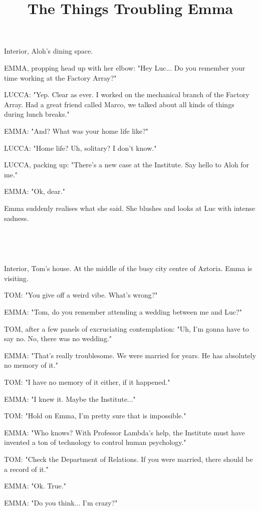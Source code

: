 \documentclass[11pt]{article}
\begin{document}
\ttfamily
\title{The Things Troubling Emma}
\maketitle

Interior, Aloh's dining space.

EMMA, propping head up with her elbow: "Hey Luc... Do you remember your time working at the Factory Array?"

LUCCA: "Yep. Clear as ever.
I worked on the mechanical branch of the Factory Array.
Had a great friend called Marco, we talked about all kinds of things during lunch breaks."

EMMA: "And? What was your home life like?"

LUCCA: "Home life? Uh, solitary? I don't know."

LUCCA, packing up: "There's a new case at the Institute.
Say hello to Aloh for me."

EMMA: "Ok, dear."

Emma suddenly realises what she said.
She blushes and looks at Luc with intense sadness.

\ 

\ 

Interior, Tom's house.
At the middle of the busy city centre of Aztoria.
Emma is visiting.

TOM: "You give off a weird vibe. 
What's wrong?"

EMMA: "Tom, do you remember attending a wedding between me and Luc?"

TOM, after a few panels of excruciating contemplation: "Uh, I'm gonna have to say no. No, there was no wedding."

EMMA: "That's really troublesome.
We were married for years. 
He has absolutely no memory of it."

TOM: "I have no memory of it either, if it happened."

EMMA: "I knew it. Maybe the Institute..."

TOM: "Hold on Emma, I'm pretty sure that is impossible."

EMMA: "Who knows? With Professor Lambda's help, the Institute must have invented a ton of technology to control human psychology."

TOM: "Check the Department of Relations. 
If you were married, there should be a record of it."

EMMA: "Ok. True."

EMMA: "Do you think... I'm crazy?"
\end{document}
